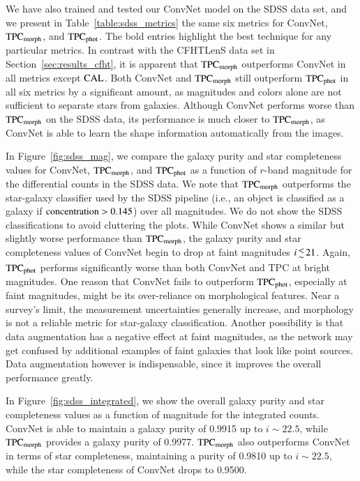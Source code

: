 \documentclass[fleqn,usenatbib]{mnras}
\newcommand{\ie}{{i.e., }}
\begin{document}
We have also trained and tested our ConvNet model on the SDSS data set, and
we present in Table~\ref{table:sdss_metrics} the same six metrics for ConvNet,
${\mathrm{TPC}}_{{\mathrm{morph}}}$, and ${\mathrm{TPC}}_{{\mathrm{phot}}}$.
The bold entries highlight the best technique for any particular metrics.
In contrast with the CFHTLenS data set in Section~\ref{sec:results_cfht},
it is apparent that ${\mathrm{TPC}}_{{\mathrm{morph}}}$ outperforms ConvNet
in all metrics except ${\mathrm{CAL}}$.
Both ConvNet and ${\mathrm{TPC}}_{{\mathrm{morph}}}$ still outperform
${\mathrm{TPC}}_{{\mathrm{phot}}}$ in all six metrics by a significant amount, as
magnitudes and colors alone are not sufficient to separate stars from galaxies.
Although ConvNet performs worse than ${\mathrm{TPC}}_{{\mathrm{morph}}}$ on the SDSS
data, its performance is much closer to ${\mathrm{TPC}}_{{\mathrm{morph}}}$, as ConvNet
is able to learn the shape information automatically from the images.

In Figure~\ref{fig:sdss_mag}, we compare the galaxy purity
and star completeness values for ConvNet, ${\mathrm{TPC}}_{{\mathrm{morph}}}$, and
${\mathrm{TPC}}_{{\mathrm{phot}}}$ as a
function of $r$-band magnitude for the differential counts in the SDSS data.
We note that ${\mathrm{TPC}}_{{\mathrm{morph}}}$ outperforms the star-galaxy
classifier used by the SDSS pipeline (\ie an object is classified as a galaxy
if ${\mathrm{concentration}} > 0.145$) over all magnitudes.
We do not show the SDSS classifications to avoid cluttering the plots.
While ConvNet shows a similar but slightly worse performance than
${\mathrm{TPC}}_{{\mathrm{morph}}}$,
the galaxy purity and star completeness values of ConvNet begin to
drop at faint magnitudes $i \la 21$.
Again, ${\mathrm{TPC}}_{{\mathrm{phot}}}$ performs significantly worse than both
ConvNet and TPC at bright magnitudes.
One reason that ConvNet fails to outperform ${\mathrm{TPC}}_{{\mathrm{phot}}}$,
especially at faint magnitudes,
might be its over-reliance on morphological features.
Near a survey's limit, the measurement uncertainties generally increase,
and morphology is not a reliable metric for star-galaxy classification.
Another possibility is that data augmentation has a negative effect at faint
magnitudes, as the network may get confused by additional examples of faint
galaxies that look like point sources.
Data augmentation however is indispensable, since it improves the overall
performance greatly.

In Figure~\ref{fig:sdss_integrated}, we show the overall galaxy purity
and star completeness values as a function of magnitude for the integrated
counts.
ConvNet is able to maintain a galaxy purity of 0.9915 up to $i\sim22.5$,
while ${\mathrm{TPC}}_{{\mathrm{morph}}}$ provides a galaxy purity of 0.9977.
${\mathrm{TPC}}_{{\mathrm{morph}}}$ also outperforms ConvNet
in terms of star completeness, maintaining a purity of 0.9810 up to
$i\sim22.5$, while the star completeness of ConvNet drops to 0.9500.
\end{document}

